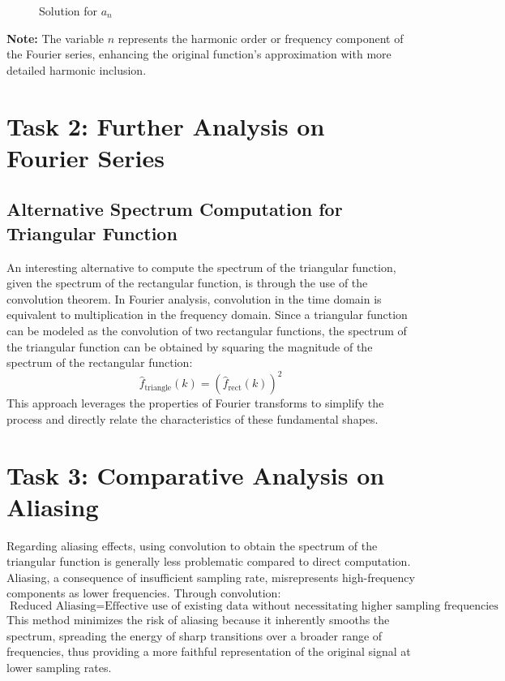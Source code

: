 \documentclass{article}
\begin{document}
\begin{figure}[h]
    \centering
    \caption{Solution for \( a_n \)}
    \label{fig:an_solution}
\end{figure}

\textbf{Note:}
The variable $n$ represents the harmonic order or frequency component of the Fourier series, enhancing the original function's approximation with more detailed harmonic inclusion.


\section*{Task 2: Further Analysis on Fourier Series}

\subsection*{Alternative Spectrum Computation for Triangular Function}
An interesting alternative to compute the spectrum of the triangular function, given the spectrum of the rectangular function, is through the use of the convolution theorem. In Fourier analysis, convolution in the time domain is equivalent to multiplication in the frequency domain. Since a triangular function can be modeled as the convolution of two rectangular functions, the spectrum of the triangular function can be obtained by squaring the magnitude of the spectrum of the rectangular function:
\[
\hat{f}_{\text{triangle}}(k) = \left(\hat{f}_{\text{rect}}(k)\right)^2
\]
This approach leverages the properties of Fourier transforms to simplify the process and directly relate the characteristics of these fundamental shapes.

\section*{Task 3: Comparative Analysis on Aliasing}
Regarding aliasing effects, using convolution to obtain the spectrum of the triangular function is generally less problematic compared to direct computation. Aliasing, a consequence of insufficient sampling rate, misrepresents high-frequency components as lower frequencies. Through convolution:
\[
\text{Reduced Aliasing} = \text{Effective use of existing data without necessitating higher sampling frequencies}
\]
This method minimizes the risk of aliasing because it inherently smooths the spectrum, spreading the energy of sharp transitions over a broader range of frequencies, thus providing a more faithful representation of the original signal at lower sampling rates.
\end{document}
